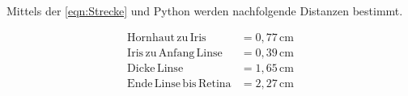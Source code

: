Mittels der \autoref{eqn:Strecke} und Python werden nachfolgende Distanzen bestimmt.

\begin{align*}
  \mathrm{Hornhaut \, zu  \, Iris} &= 0,77 \, \si{\centi\meter}\\
  \mathrm{Iris \, zu \, Anfang \, Linse} &= 0,39 \, \si{\centi\meter}\\
  \mathrm{Dicke \, Linse} &= 1,65 \, \si{\centi\meter}\\
  \mathrm{Ende \, Linse \, bis \, Retina} &= 2,27 \, \si{\centi\meter}\\
\end{align*}
